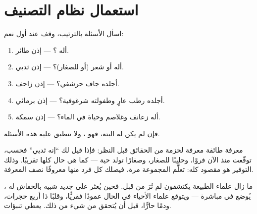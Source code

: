 \section{استعمال نظام التصنيف}

\begin{method}\label{met:g4:classifying-animals:place}
اسأل الأسئلة بالترتيب، وقف عند أول نعم:
\begin{enumerate}
  \item أله ؟ --- إذن طائر.
  \item أله  أو شعر (أو  للصغار)؟ --- إذن ثديي.
  \item أجلده جاف حرشفي؟ --- إذن زاحف.
  \item أجلده رطب عارٍ وطفولته شرغوفية؟ --- إذن برمائي.
  \item أله زعانف وغلاصم وحياة في الماء؟ --- إذن سمكة.
\end{enumerate}
فإن لم يكن له  البتة، فهو ، ولا تنطبق عليه هذه
الأسئلة.
\end{method}

\begin{proposition}\label{prop:g4:classifying-animals:free}
معرفة طائفة  معرفة لحزمة من الحقائق قبل النظر: فإذا قيل لك
``إنه ثديي'' فحسب، توقّعت منذ الآن فروًا، وحليبًا للصغار، وصغارًا
تولد حية --- كما هي حال  كلها تقريبًا. وذلك التوفير هو
مقصود  كله: تعلَّم المجموعة مرة، فيصلك كل فرد منها معروفًا
نصف المعرفة.
\end{proposition}
\admitted

\begin{example}\label{ex:g4:classifying-animals:new}
ما زال علماء الطبيعة يكتشفون  لم تُرَ من قبل. فحين يُعثر
على  جديد شبيه بالخفاش له  ، يُوضع في 
مباشرة --- ويتوقع علماء الأحياء في الحال عمودًا فقريًّا، وقلبًا ذا
أربع حجرات، ودمًا حارًّا، قبل أن يُتحقق من شيء من ذلك.  يعطي تنبؤات.
\end{example}

